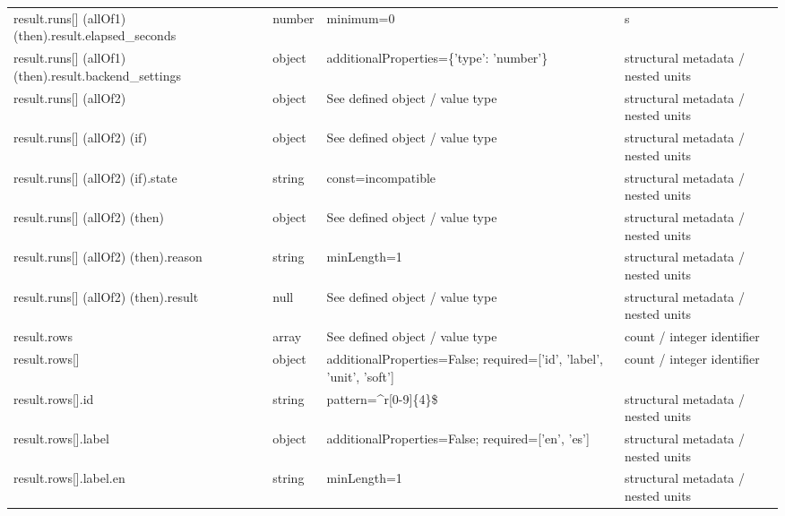 \begin{longtable}{@{}>{\raggedright\arraybackslash}p{}>{\raggedright\arraybackslash}p{}>{\raggedright\arraybackslash}p{}>{\raggedright\arraybackslash}p{}@{}}
result.\allowbreak{}runs[] (allOf1) (then).\allowbreak{}result.\allowbreak{}elapsed\_\allowbreak{}seconds & number & minimum=\allowbreak{}0 & s\\
result.\allowbreak{}runs[] (allOf1) (then).\allowbreak{}result.\allowbreak{}backend\_\allowbreak{}settings & object & additionalProperties=\allowbreak{}\{'type': 'number'\} & structural metadata /\allowbreak{} nested units\\
result.\allowbreak{}runs[] (allOf2) & object & See defined object /\allowbreak{} value type & structural metadata /\allowbreak{} nested units\\
result.\allowbreak{}runs[] (allOf2) (if) & object & See defined object /\allowbreak{} value type & structural metadata /\allowbreak{} nested units\\
result.\allowbreak{}runs[] (allOf2) (if).\allowbreak{}state & string & const=\allowbreak{}incompatible & structural metadata /\allowbreak{} nested units\\
result.\allowbreak{}runs[] (allOf2) (then) & object & See defined object /\allowbreak{} value type & structural metadata /\allowbreak{} nested units\\
result.\allowbreak{}runs[] (allOf2) (then).\allowbreak{}reason & string & minLength=\allowbreak{}1 & structural metadata /\allowbreak{} nested units\\
result.\allowbreak{}runs[] (allOf2) (then).\allowbreak{}result & null & See defined object /\allowbreak{} value type & structural metadata /\allowbreak{} nested units\\
result.\allowbreak{}rows & array & See defined object /\allowbreak{} value type & count /\allowbreak{} integer identifier\\
result.\allowbreak{}rows[] & object & additionalProperties=\allowbreak{}False; required=\allowbreak{}['id', 'label', 'unit', 'soft'] & count /\allowbreak{} integer identifier\\
result.\allowbreak{}rows[].\allowbreak{}id & string & pattern=\allowbreak{}\textasciicircum{}r[0-9]\{4\}\$ & structural metadata /\allowbreak{} nested units\\
result.\allowbreak{}rows[].\allowbreak{}label & object & additionalProperties=\allowbreak{}False; required=\allowbreak{}['en', 'es'] & structural metadata /\allowbreak{} nested units\\
result.\allowbreak{}rows[].\allowbreak{}label.\allowbreak{}en & string & minLength=\allowbreak{}1 & structural metadata /\allowbreak{} nested units\\

\end{longtable}
